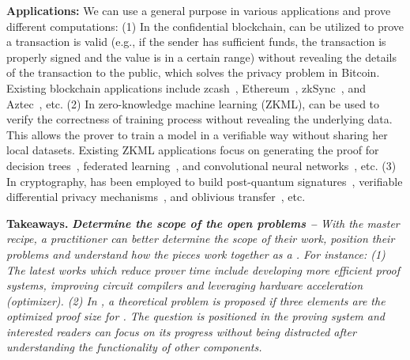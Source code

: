 \documentclass[letterpaper,twocolumn,10pt]{article}
\theoremstyle{definition}
\newcommand{\mypara}[1]{\noindent\textbf{{#1: }}}
\newcommand{\zk}{\text{zk-SNARK}\xspace}
\newcommand{\new}[1]{{#1}\xspace}
\newenvironment{takeaway}[1][]
  {
 \begin{tcolorbox}
 [%
    enhanced, 
    breakable,
    boxrule=0.5pt,
    arc=4pt,
    left=2pt,
    right=2pt,
    bottom=2pt,
    top=2pt,
    rounded corners
    ]{}
  \textbf{#1.}
  \small \itshape}
  {
\end{tcolorbox}
}
\begin{document}
\new{
	\mypara{Applications}We can use a general purpose \zk in various applications and prove different computations: (1) In the confidential blockchain, \zk can be utilized to prove a transaction is valid (e.g., if the sender has sufficient funds, the transaction is properly signed and the value is in a certain range) without revealing the details of the transaction to the public, which solves the privacy problem in Bitcoin. Existing blockchain applications include zcash~\cite{sasson2014zerocash}, Ethereum~\cite{wood2014ethereum}, zkSync~\cite{zksync}, and Aztec~\cite{aztecprotocol}, etc. (2) In zero-knowledge machine learning (ZKML), \zk can be used to verify the correctness of training process without revealing the underlying data. This allows the prover to train a model in a verifiable way without sharing her local datasets. Existing ZKML applications focus on generating the proof for decision trees~\cite{zhang2020zero}, federated learning~\cite{duan2024verifiable}, and convolutional neural networks~\cite{liu2021zkcnn}, etc. (3) In cryptography, \zk has been employed to build post-quantum signatures~\cite{chase2020picnic}, verifiable differential privacy mechanisms~\cite{biswas2023interactive}, and oblivious transfer~\cite{hazay2010efficient}, etc. 
}

	

\begin{takeaway}[Takeaways]
	\textbf{\new{Determine the scope of the open problems --}}
	\new{With the master recipe, a practitioner can better determine the scope of their work, position their problems and understand how the pieces work together as a \zk. For instance: (1) The latest works which reduce prover time include developing more efficient proof systems, improving circuit compilers and leveraging hardware acceleration (optimizer). (2) In \cite{groth2016size}, a theoretical problem is proposed if three elements are the optimized proof size for \zk. The question is positioned in the proving system and interested readers can focus on its progress without being distracted after understanding the functionality of other components.}
	
\end{takeaway}
\end{document}
